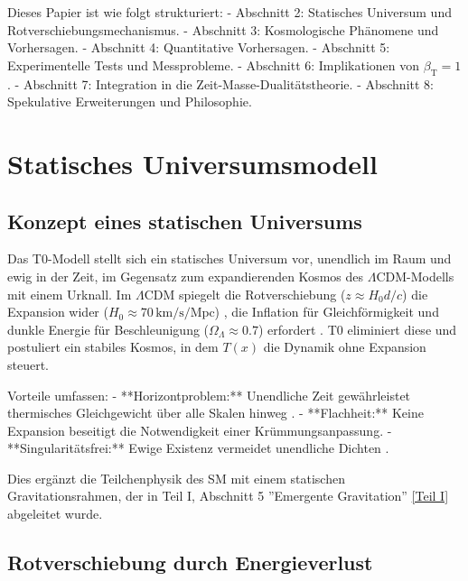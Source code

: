 \documentclass[12pt,a4paper]{article}
\newcommand{\Tfield}{T(x)}
\newcommand{\betaT}{\beta_{\text{T}}}
\begin{document}
	Dieses Papier ist wie folgt strukturiert:
	- Abschnitt 2: Statisches Universum und Rotverschiebungsmechanismus.
	- Abschnitt 3: Kosmologische Phänomene und Vorhersagen.
	- Abschnitt 4: Quantitative Vorhersagen.
	- Abschnitt 5: Experimentelle Tests und Messprobleme.
	- Abschnitt 6: Implikationen von \(\betaT = 1\).
	- Abschnitt 7: Integration in die Zeit-Masse-Dualitätstheorie.
	- Abschnitt 8: Spekulative Erweiterungen und Philosophie.
	
	\section{Statisches Universumsmodell}
	\label{sec:static_universe}
	
	\subsection{Konzept eines statischen Universums}
	\label{subsec:static_concept}
	
	Das T0-Modell stellt sich ein statisches Universum vor, unendlich im Raum und ewig in der Zeit, im Gegensatz zum expandierenden Kosmos des \(\Lambda\)CDM-Modells mit einem Urknall. Im \(\Lambda\)CDM spiegelt die Rotverschiebung (\(z \approx H_0 d / c\)) die Expansion wider (\(H_0 \approx 70 \, \text{km/s/Mpc}\)) \cite{Planck2020}, die Inflation für Gleichförmigkeit und dunkle Energie für Beschleunigung (\(\Omega_{\Lambda} \approx 0.7\)) erfordert \cite{Riess1998}. T0 eliminiert diese und postuliert ein stabiles Kosmos, in dem \(\Tfield\) die Dynamik ohne Expansion steuert.
	
	Vorteile umfassen:
	- **Horizontproblem:** Unendliche Zeit gewährleistet thermisches Gleichgewicht über alle Skalen hinweg \cite{pascher_messdifferenzen_2025}.
	- **Flachheit:** Keine Expansion beseitigt die Notwendigkeit einer Krümmungsanpassung.
	- **Singularitätsfrei:** Ewige Existenz vermeidet unendliche Dichten \cite{pascher_perspective_2025}.
	
	Dies ergänzt die Teilchenphysik des SM mit einem statischen Gravitationsrahmen, der in Teil I, Abschnitt 5 ''Emergente Gravitation'' \href{https://github.com/jpascher/T0-Time-Mass-Duality/tree/main/2/pdf/Deutsch/QMRelTimeMassPart1.pdf}{[Teil I]} abgeleitet wurde.
	
	\subsection{Rotverschiebung durch Energieverlust}
	\label{subsec:redshift_energy_loss}
	
\end{document}
